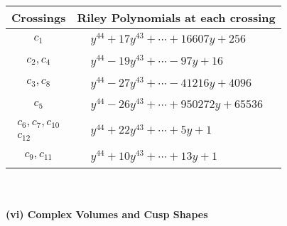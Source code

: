 \documentclass[1p]{elsarticle_modified}
\theoremstyle{definition}
\begin{document}
\begin{tabular}{m{50pt}|m{274pt}}
Crossings & \hspace{64pt}Riley Polynomials at each crossing \\
\hline $$\begin{aligned}c_{1}\end{aligned}$$&$\begin{aligned}
&y^{44}+17 y^{43}+\cdots+16607 y+256
\end{aligned}$\\
\hline $$\begin{aligned}c_{2},c_{4}\end{aligned}$$&$\begin{aligned}
&y^{44}-19 y^{43}+\cdots-97 y+16
\end{aligned}$\\
\hline $$\begin{aligned}c_{3},c_{8}\end{aligned}$$&$\begin{aligned}
&y^{44}-27 y^{43}+\cdots-41216 y+4096
\end{aligned}$\\
\hline $$\begin{aligned}c_{5}\end{aligned}$$&$\begin{aligned}
&y^{44}-26 y^{43}+\cdots+950272 y+65536
\end{aligned}$\\
\hline $$\begin{aligned}c_{6},c_{7},c_{10}\\c_{12}\end{aligned}$$&$\begin{aligned}
&y^{44}+22 y^{43}+\cdots+5 y+1
\end{aligned}$\\
\hline $$\begin{aligned}c_{9},c_{11}\end{aligned}$$&$\begin{aligned}
&y^{44}+10 y^{43}+\cdots+13 y+1
\end{aligned}$\\
\hline
\end{tabular}\\~\\
\newpage\flushleft \textbf{(vi) Complex Volumes and Cusp Shapes}
\end{document}

